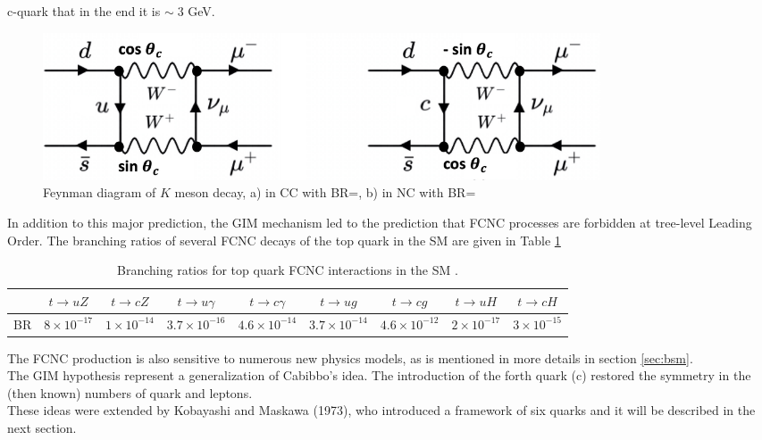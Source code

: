 c-quark that in the end it is $\sim\; 3$ GeV.
\begin{figure}[h]
	\centering
	\includegraphics[width=0.8\textwidth]{Chapters/CH1/figures/kdecay}
	\caption{Feynman diagram of $K$ meson decay, a) in CC with BR=,  b) in NC with BR=}
	\label{fig:Kdecay}
\end{figure}
In addition to this major prediction, the GIM mechanism led to the prediction that FCNC processes are forbidden at tree-level Leading Order. The branching ratios of several FCNC decays of the top quark in the SM are given in Table \ref{tab:SM_BR}
\begin{table}[h]
	\begin{adjustbox}{max width=1.\textwidth,center}
		\begin{tabular}{|c|c|c|c|c|c|c|c|c|}
		\hline 
  & $ t\rightarrow uZ$    & $ t\rightarrow cZ$    & $ t\rightarrow u\gamma$ & $ t\rightarrow c\gamma$ & $ t\rightarrow ug$       & $ t\rightarrow cg$       & $ t\rightarrow uH$     & $ t\rightarrow cH$  \\ 
	\hline 
	BR & $8\times 10^{-17} $ & $1\times 10^{-14} $ & $3.7\times 10^{-16} $       & $4.6\times 10^{-14} $      & $3.7\times 10^{-14} $  & $4.6\times 10^{-12} $ & $2\times 10^{-17} $  &$3\times 10^{-15} $  \\ 
		\hline 
		\end{tabular} 
	\end{adjustbox}
\caption{Branching ratios for top quark FCNC interactions in the SM \cite{aguilar}.}
\label{tab:SM_BR}
\end{table}
\noindent The FCNC production is also sensitive to numerous new physics models, as is mentioned in more details in section \ref{sec:bsm}.\\
The GIM hypothesis represent a generalization of Cabibbo's idea. The introduction of the forth quark (c) restored the symmetry
in the (then known)  numbers of quark and leptons.\\
These ideas were extended by Kobayashi and Maskawa (1973), who introduced a framework of six quarks and it will be described in the next section.


